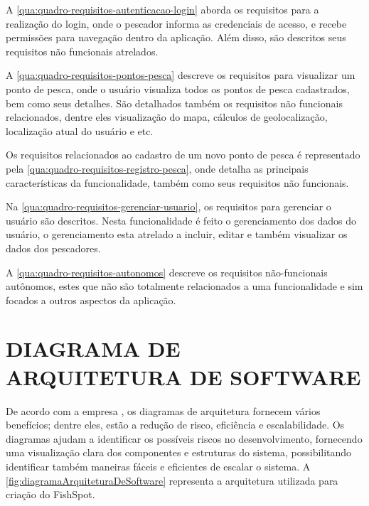 A \autoref{qua:quadro-requisitos-autenticacao-login} aborda os requisitos para a realização do login, onde o pescador informa as credenciais de acesso, e recebe permissões para navegação dentro da aplicação. Além disso, são descritos seus requisitos não funcionais atrelados.



A \autoref{qua:quadro-requisitos-pontos-pesca} descreve os requisitos para visualizar um ponto de pesca, onde o usuário visualiza todos os pontos de pesca cadastrados, bem como seus detalhes. São detalhados também os requisitos não funcionais relacionados, dentre eles visualização do mapa, cálculos de geolocalização, localização atual do usuário e etc.



Os requisitos relacionados ao cadastro de um novo ponto de pesca é representado pela \autoref{qua:quadro-requisitos-registro-pesca}, onde detalha as principais características da funcionalidade, também como seus requisitos não funcionais.



Na \autoref{qua:quadro-requisitos-gerenciar-usuario}, os requisitos para gerenciar o usuário são descritos. Nesta funcionalidade é feito o gerenciamento dos dados do usuário, o gerenciamento esta atrelado a incluir, editar e também visualizar os dados dos pescadores.



A \autoref{qua:quadro-requisitos-autonomos} descreve os requisitos não-funcionais autônomos, estes que não são totalmente relacionados a uma funcionalidade e sim focados a outros aspectos da aplicação.



\section{DIAGRAMA DE ARQUITETURA DE SOFTWARE}
\label{sec:diagramadearquiteturadesoftware}

De acordo com a empresa \textcite{AwsAmazon2024}, os diagramas de arquitetura fornecem vários benefícios; dentre eles, estão a redução de risco, eficiência e escalabilidade. Os diagramas ajudam a identificar os possíveis riscos no desenvolvimento, fornecendo uma visualização clara dos componentes e estruturas do sistema, possibilitando identificar também maneiras fáceis e eficientes de escalar o sistema. A \autoref{fig:diagramaArquiteturaDeSoftware} representa a arquitetura utilizada para criação do FishSpot.

